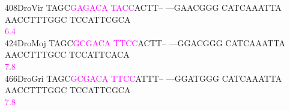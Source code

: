 \documentclass[11pt,twoside,reqno,a4paper]{article}
\begin{document}
{408\hspace*{1\charwidth}DroVir	TAGC\textcolor{magenta}{G}\textcolor{magenta}{A}\textcolor{magenta}{G}\textcolor{magenta}{A}\textcolor{magenta}{C}\textcolor{magenta}{A}	\textcolor{magenta}{T}\textcolor{magenta}{A}\textcolor{magenta}{C}\textcolor{magenta}{C}ACTT--	---GAACGGG	CATCAAATTA	AACCTTTGGC	TCCATTCGCA	\\
\hspace*{4\charwidth}\hspace*{7\charwidth}\hspace*{4\charwidth}\textcolor{magenta}{6.4}\hspace*{1\charwidth}\hspace*{1\charwidth}\hspace*{1\charwidth}\hspace*{1\charwidth}\hspace*{1\charwidth}\hspace*{1\charwidth}\\
424\hspace*{1\charwidth}DroMoj	TAGC\textcolor{magenta}{G}\textcolor{magenta}{C}\textcolor{magenta}{G}\textcolor{magenta}{A}\textcolor{magenta}{C}\textcolor{magenta}{A}	\textcolor{magenta}{T}\textcolor{magenta}{T}\textcolor{magenta}{C}\textcolor{magenta}{C}ACTT--	---GGACGGG	CATCAAATTA	AACCTTTGCC	TCCATTCACA	\\
\hspace*{4\charwidth}\hspace*{7\charwidth}\hspace*{4\charwidth}\textcolor{magenta}{7.8}\hspace*{1\charwidth}\hspace*{1\charwidth}\hspace*{1\charwidth}\hspace*{1\charwidth}\hspace*{1\charwidth}\hspace*{1\charwidth}\\
466\hspace*{1\charwidth}DroGri	TAGC\textcolor{magenta}{G}\textcolor{magenta}{C}\textcolor{magenta}{G}\textcolor{magenta}{A}\textcolor{magenta}{C}\textcolor{magenta}{A}	\textcolor{magenta}{T}\textcolor{magenta}{T}\textcolor{magenta}{C}\textcolor{magenta}{C}ATTT--	---GGATGGG	CATCAAATTA	AACCTTTGGC	TCCATTCGCA	\\
\hspace*{4\charwidth}\hspace*{7\charwidth}\hspace*{4\charwidth}\textcolor{magenta}{7.8}\hspace*{1\charwidth}\hspace*{1\charwidth}\hspace*{1\charwidth}\hspace*{1\charwidth}\hspace*{1\charwidth}\hspace*{1\charwidth}\\
}
\end{document}
